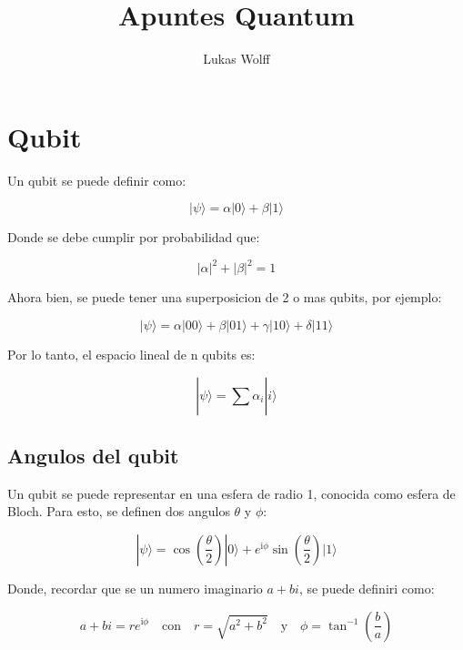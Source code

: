 \documentclass[11pt]{article}
\title{\textbf{\LARGE Apuntes Quantum}}
\author{
    Lukas Wolff}
\date{}
\newcommand{\ii}{\mathrm{i}}
\begin{document}
\maketitle

\section{Qubit}

Un qubit se puede definir como:

\begin{equation}
    |\psi\rangle = \alpha |0\rangle + \beta |1\rangle
\end{equation}

Donde se debe cumplir por probabilidad que:

\begin{equation}
    |\alpha|^2 + |\beta|^2 = 1
\end{equation}

Ahora bien, se puede tener una superposicion de 2 o mas qubits, por ejemplo:

\begin{equation}
    |\psi\rangle = \alpha |00\rangle + \beta |01\rangle + \gamma |10\rangle + \delta |11\rangle
\end{equation}

Por lo tanto, el espacio lineal de n qubits es:

\begin{equation}
    |\psi\rangle = \sum_{}^{} \alpha_i |i\rangle
\end{equation}

\subsection{Angulos del qubit}

Un qubit se puede representar en una esfera de radio 1, conocida como esfera de Bloch. Para esto, se definen dos angulos $\theta$ y $\phi$:

\begin{equation}
    |\psi\rangle = \cos\left(\frac{\theta}{2}\right) |0\rangle + e^{\ii \phi} \sin\left(\frac{\theta}{2}\right) |1\rangle
\end{equation}

Donde, recordar que se un numero imaginario $a + bi$, se puede definiri como:

\begin{equation}
    a + bi = re^{\ii \phi} \quad \text{con} \quad r = \sqrt{a^2 + b^2} \quad \text{y} \quad \phi = \tan^{-1}\left(\frac{b}{a}\right)
\end{equation}
\end{document}

